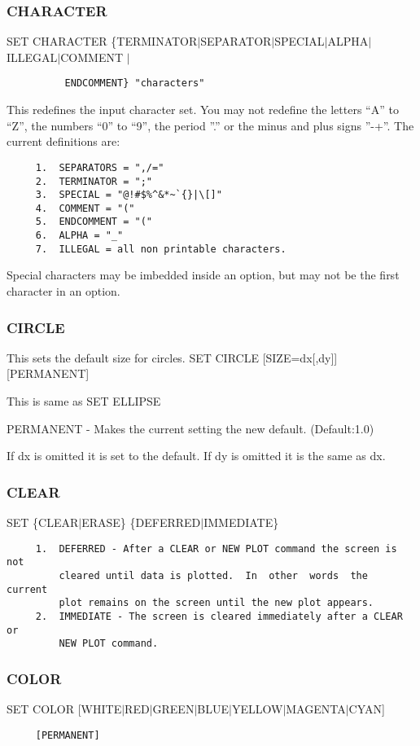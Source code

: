 \subsubsection{CHARACTER}
SET CHARACTER \{TERMINATOR$|$SEPARATOR$|$SPECIAL$|$ALPHA$|$ILLEGAL$|$COMMENT $|$
\begin{verbatim}
          ENDCOMMENT} "characters" 
\end{verbatim}
This  redefines  the  input  character  set.   You may not redefine the
letters ``A'' to ``Z'', the numbers ``0'' to ``9'', the period ''.'' or the minus
and plus signs ''-+''.  The current definitions are:  
\begin{verbatim}
     1.  SEPARATORS = ",/=" 
     2.  TERMINATOR = ";" 
     3.  SPECIAL = "@!#$%^&*~`{}|\[]" 
     4.  COMMENT = "(" 
     5.  ENDCOMMENT = "(" 
     6.  ALPHA = "_" 
     7.  ILLEGAL = all non printable characters.  
\end{verbatim}
Special characters may be imbedded inside an option, but may not be the
first character in an option.  
\subsubsection{CIRCLE}
This sets the default size for circles.  
SET CIRCLE [SIZE=dx[,dy]] [PERMANENT] 

This is same as SET ELLIPSE 

PERMANENT - Makes the current setting the new default.  
(Default:1.0) 

If dx is omitted it is set to the default.  If dy is omitted it is the
same as dx.  
\subsubsection{CLEAR}
SET \{CLEAR$|$ERASE\} \{DEFERRED$|$IMMEDIATE\} 

\begin{verbatim}
     1.  DEFERRED - After a CLEAR or NEW PLOT command the screen is not
         cleared until data is plotted.  In  other  words  the  current
         plot remains on the screen until the new plot appears.  
     2.  IMMEDIATE - The screen is cleared immediately after a CLEAR or
         NEW PLOT command.  
\end{verbatim}
\subsubsection{COLOR}
SET COLOR [WHITE$|$RED$|$GREEN$|$BLUE$|$YELLOW$|$MAGENTA$|$CYAN] 
\begin{verbatim}
     [PERMANENT] 
\end{verbatim}

